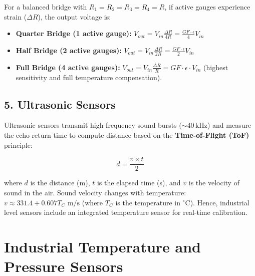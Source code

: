 \documentclass[12pt,a4paper]{article}
\begin{document}
For a balanced bridge with $R_1=R_2=R_3=R_4=R$, if active gauges experience strain ($\Delta R$), the output voltage is:
\begin{itemize}[leftmargin=*, itemsep=2.5pt]
  \item \textbf{Quarter Bridge (1 active gauge):} $V_{out} = V_{in} \frac{\Delta R}{4R} = \frac{GF \cdot \epsilon}{4} V_{in}$
  \item \textbf{Half Bridge (2 active gauges):} $V_{out} = V_{in} \frac{\Delta R}{2R} = \frac{GF \cdot \epsilon}{2} V_{in}$
  \item \textbf{Full Bridge (4 active gauges):} $V_{out} = V_{in} \frac{\Delta R}{R} = GF \cdot \epsilon \cdot V_{in}$ (highest sensitivity and full temperature compensation).
\end{itemize}

\subsection{5. Ultrasonic Sensors}
Ultrasonic sensors transmit high-frequency sound bursts ($\sim 40\,$kHz) and measure the echo return time to compute distance based on the \textbf{Time-of-Flight (ToF)} principle:
\begin{tcolorbox}[formulabox, title={\textbf{ToF Distance Equation}}]
\[
d = \frac{v \times t}{2}
\]
\end{tcolorbox}
where $d$ is the distance (m), $t$ is the elapsed time (s), and $v$ is the velocity of sound in the air. 
Sound velocity changes with temperature: $v \approx 331.4 + 0.607 T_C \text{ m/s}$ (where $T_C$ is the temperature in $^\circ$C). Hence, industrial level sensors include an integrated temperature sensor for real-time calibration.


\section{Industrial Temperature and Pressure Sensors}
\end{document}

